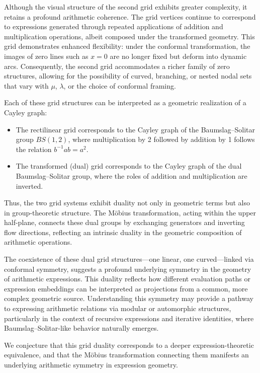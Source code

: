 Although the visual structure of the second grid exhibits greater complexity, it retains a profound arithmetic coherence. The grid vertices continue to correspond to expressions generated through repeated applications of addition and multiplication operations, albeit composed under the transformed geometry. This grid demonstrates enhanced flexibility: under the conformal transformation, the images of zero lines such as $x=0$ are no longer fixed but deform into dynamic arcs. Consequently, the second grid accommodates a richer family of zero structures, allowing for the possibility of curved, branching, or nested nodal sets that vary with $\mu$, $\lambda$, or the choice of conformal framing.

Each of these grid structures can be interpreted as a geometric realization of a Cayley graph:

\begin{itemize}
\item The rectilinear grid corresponds to the Cayley graph of the Baumslag–Solitar group $BS(1,2)$, where multiplication by 2 followed by addition by 1 follows the relation $b^{-1}ab = a^2$.
\item The transformed (dual) grid corresponds to the Cayley graph of the dual Baumslag–Solitar group, where the roles of addition and multiplication are inverted.
\end{itemize}

Thus, the two grid systems exhibit duality not only in geometric terms but also in group-theoretic structure. The Möbius transformation, acting within the upper half-plane, connects these dual groups by exchanging generators and inverting flow directions, reflecting an intrinsic duality in the geometric composition of arithmetic operations.

The coexistence of these dual grid structures—one linear, one curved—linked via conformal symmetry, suggests a profound underlying symmetry in the geometry of arithmetic expressions. This duality reflects how different evaluation paths or expression embeddings can be interpreted as projections from a common, more complex geometric source. Understanding this symmetry may provide a pathway to expressing arithmetic relations via modular or automorphic structures, particularly in the context of recursive expressions and iterative identities, where Baumslag–Solitar-like behavior naturally emerges.

We conjecture that this grid duality corresponds to a deeper expression-theoretic equivalence, and that the Möbius transformation connecting them manifests an underlying arithmetic symmetry in expression geometry.

